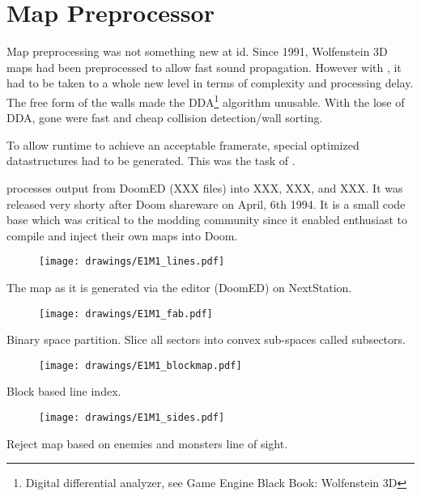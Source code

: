 \section{Map Preprocessor}
Map preprocessing was not something new at id. Since 1991, Wolfenstein 3D maps had been preprocessed to allow fast sound propagation. However with \doom, it had to be taken to a whole new level in terms of complexity and processing delay. The free form of the walls made the DDA\footnote{Digital differential analyzer, see Game Engine Black Book: Wolfenstein 3D} algorithm unusable. With the lose of DDA, gone were fast and cheap collision detection/wall sorting.\\
\par
To allow runtime to achieve an acceptable framerate, special optimized datastructures had to be generated. This was the task of 
.\\
\par
 processes output from DoomED (XXX files) into XXX, XXX, and XXX. It was released very shorty after Doom shareware on April, 6th 1994. It is a small code base which was critical to the modding community since it enabled enthusiast to compile and inject their own maps into Doom.\\
\par
{}
\par
{}




\pagebreak
\par
\begin{figure}[H]
\centering
\texttt{[image: drawings/E1M1\_lines.pdf]}
\end{figure}
\par
The map as it is generated via the editor (DoomED) on NextStation.\\
\par
\begin{figure}[H]
\centering
\texttt{[image: drawings/E1M1\_fab.pdf]}
\end{figure}
\par
Binary space partition. Slice all sectors into convex sub-spaces called subsectors.\\
\par
\begin{figure}[H]
\centering
\texttt{[image: drawings/E1M1\_blockmap.pdf]}
\end{figure}
\par
Block based line index.\\
\par
\begin{figure}[H]
\centering
\texttt{[image: drawings/E1M1\_sides.pdf]}
\end{figure}
\par
Reject map based on enemies and monsters line of sight.\\


